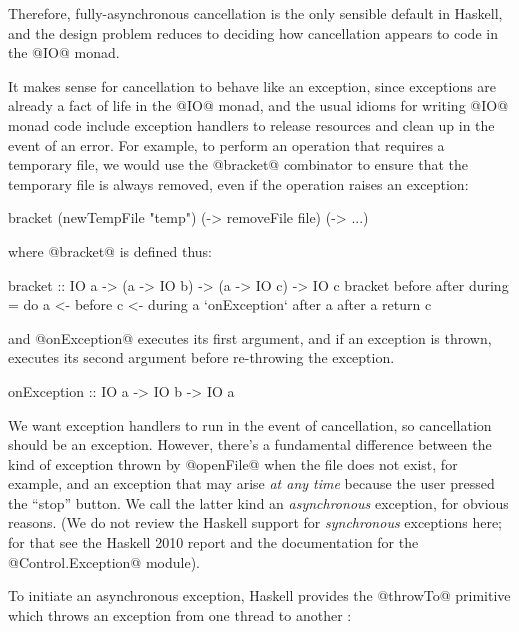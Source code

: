 Therefore, fully-asynchronous cancellation is the only sensible
default in Haskell, and the design problem reduces to deciding how
cancellation appears to code in the @IO@ monad.

It makes sense for cancellation to behave like an exception, since
exceptions are already a fact of life in the @IO@ monad, and the usual
idioms for writing @IO@ monad code include exception handlers to
release resources and clean up in the event of an error.  For example,
to perform an operation that requires a temporary file, we would use
the @bracket@ combinator to ensure that the temporary file is always
removed, even if the operation raises an exception:

\begin{haskell}
  bracket (newTempFile "temp")
          (\file -> removeFile file)
          (\file -> ...)
\end{haskell}

\noindent where @bracket@ is defined thus:

\begin{haskell}
bracket :: IO a -> (a -> IO b) -> (a -> IO c) -> IO c
bracket before after during = do
  a <- before
  c <- during a `onException` after a
  after a
  return c
\end{haskell}

\noindent and @onException@ executes its first argument, and if an
exception is thrown, executes its second argument before re-throwing
the exception.

\begin{haskell}
onException :: IO a -> IO b -> IO a
\end{haskell}

We want exception handlers to run in the event of cancellation, so
cancellation should be an exception.  However, there's a fundamental
difference between the kind of exception thrown by @openFile@ when the
file does not exist, for example, and an exception that may arise
\emph{at any time} because the user pressed the ``stop'' button.  We
call the latter kind an \emph{asynchronous} exception, for obvious
reasons.  (We do not review the Haskell support for \emph{synchronous}
exceptions here; for that see the Haskell 2010 report
\cite{haskell2010} and the documentation for the @Control.Exception@
module).

To initiate an asynchronous exception, Haskell provides the @throwTo@
primitive which throws an exception from one thread to
another \cite{spj:asynch-exceptions}:

